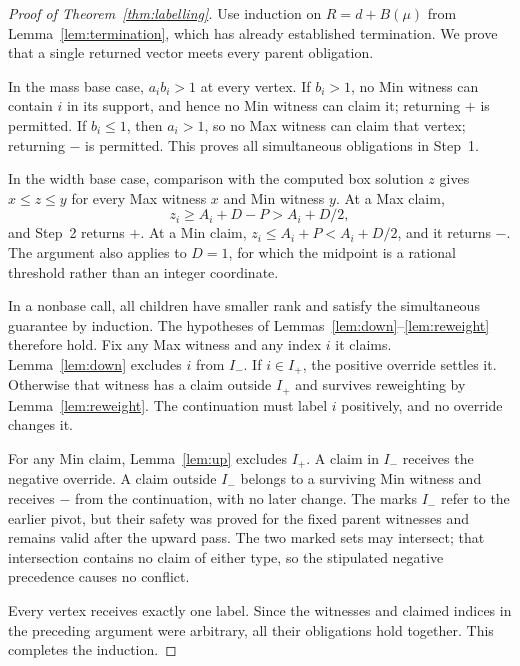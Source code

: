 \begin{proof}[Proof of Theorem~\ref{thm:labelling}]
Use induction on $R=d+B(\mu)$ from
Lemma~\ref{lem:termination}, which has already established
termination. We prove that a single returned vector meets every
parent obligation.

In the mass base case, $a_i b_i>1$ at every vertex. If $b_i>1$,
no Min witness can contain $i$ in its support, and hence no Min
witness can claim it; returning $+$ is permitted. If $b_i\le1$,
then $a_i>1$, so no Max witness can claim that vertex; returning
$-$ is permitted. This proves all simultaneous obligations in
Step~1.

In the width base case, comparison with the computed box solution
$z$ gives $x\le z\le y$ for every Max witness $x$ and Min
witness $y$. At a Max claim,
\[
                   z_i\ge A_i+D-P>A_i+D/2,
\]
and Step~2 returns $+$. At a Min claim,
$z_i\le A_i+P<A_i+D/2$, and it returns $-$. The argument
also applies to $D=1$, for which the midpoint is a rational
threshold rather than an integer coordinate.

In a nonbase call, all children have smaller rank and satisfy the
simultaneous guarantee by induction. The hypotheses of
Lemmas~\ref{lem:down}--\ref{lem:reweight} therefore hold. Fix
any Max witness and any index $i$ it claims. Lemma~\ref{lem:down}
excludes $i$ from $I_-$. If $i\in I_+$, the positive override
settles it. Otherwise that witness has a claim outside $I_+$ and
survives reweighting by Lemma~\ref{lem:reweight}. The continuation
must label $i$ positively, and no override changes it.

For any Min claim, Lemma~\ref{lem:up} excludes $I_+$. A claim
in $I_-$ receives the negative override. A claim outside $I_-$
belongs to a surviving Min witness and receives $-$ from the
continuation, with no later change. The marks $I_-$ refer to the
earlier pivot, but their safety was proved for the fixed parent
witnesses and remains valid after the upward pass. The two marked
sets may intersect; that intersection contains no claim of either
type, so the stipulated negative precedence causes no conflict.

Every vertex receives exactly one label. Since the witnesses and
claimed indices in the preceding argument were arbitrary, all their
obligations hold together. This completes the induction.
\end{proof}
